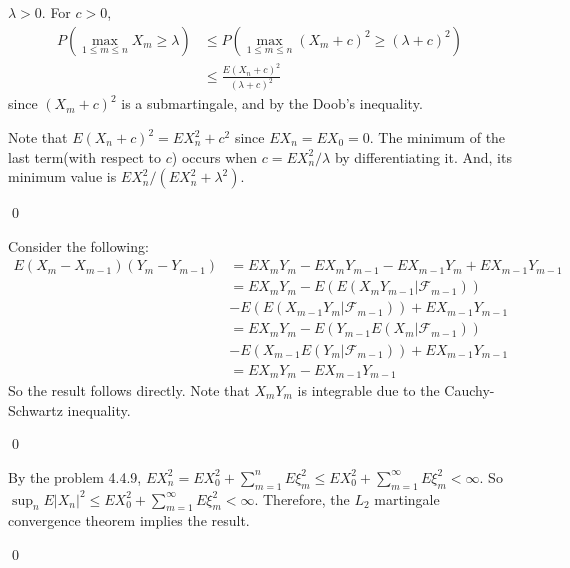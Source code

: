 \begin{problem}[4.4.7] \hfill

	$\lambda >0$. For $c>0$,
	\[
		\begin{split}
			P(\max_{1\leq m \leq n} X_m \geq \lambda)
			& \leq P \left ( \max_{1 \leq m \leq n} (X_m + c)^2 \geq (\lambda+c)^2 \right ) \\
			& \leq \frac{E(X_n+c)^2}{(\lambda+c)^2}
		\end{split}
	\]
	since $(X_m + c)^2$ is a submartingale, and by the Doob's inequality.

	Note that $E(X_n+c)^2 = EX_n^2 + c^2$ since $EX_n = EX_0 = 0$.
	The minimum of the last term(with respect to $c$) occurs when $c = EX_n^2 / \lambda$ by differentiating it.
	And, its minimum value is $EX_n^2 /(EX_n^2 + \lambda^2)$.

	\qed
\end{problem}

\begin{problem}[4.4.9] \hfill

	Consider the following:
	\[
		\begin{split}
			E\left( X_m -X_{m-1} \right)\left( Y_m -Y_{m-1} \right)
			& = EX_mY_m - EX_mY_{m-1} - EX_{m-1}Y_m + EX_{m-1}Y_{m-1} \\
			& = EX_mY_m - E\left( E(X_m Y_{m-1} | \mathcal{F}_{m-1}) \right) \\
			& - E\left( E(X_{m-1}Y_m | \mathcal{F}_{m-1} ) \right) + EX_{m-1}Y_{m-1} \\
			& = EX_mY_m - E\left( Y_{m-1}E(X_m | \mathcal{F}_{m-1}) \right) \\
			& - E\left( X_{m-1}E(Y_m | \mathcal{F}_{m-1}) \right) +EX_{m-1}Y_{m-1} \\
			& = EX_mY_m -EX_{m-1}Y_{m-1}
		\end{split}
	\]
	So the result follows directly.
	Note that $X_m Y_m$ is integrable due to the Cauchy-Schwartz inequality. 

	\qed
\end{problem}

\begin{problem}[4.4.10] \hfill
	
	By the problem 4.4.9, $EX_n^2 = EX_0^2 + \sum_{m=1}^n E\xi_m^2 \leq EX_0^2 +\sum_{m=1}^\infty E\xi_m^2 < \infty$.
	So $\sup_n E|X_n|^2 \leq EX_0^2 + \sum_{m=1}^\infty E\xi_m^2 < \infty$.
	Therefore, the $L_2$ martingale convergence theorem implies the result.

	\qed

\end{problem}

